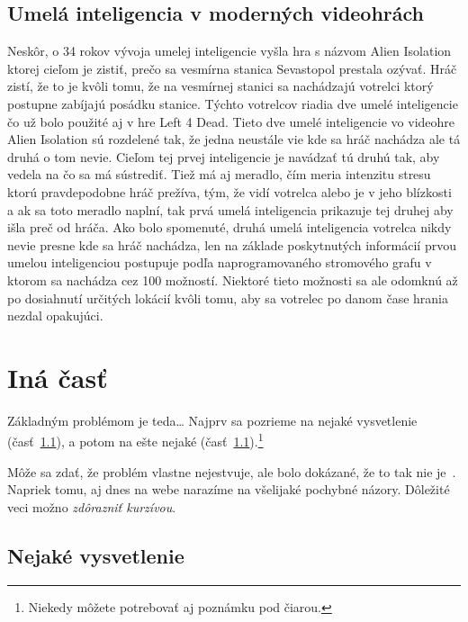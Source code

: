 \documentclass[10pt,twoside,slovak,a4paper]{article}
\begin{document}
\subsection{Umelá inteligencia v moderných videohrách} \label{kapitola2.3}
Neskôr, o 34 rokov vývoja umelej inteligencie vyšla hra s názvom Alien Isolation ktorej cieľom je zistiť, prečo sa vesmírna stanica Sevastopol prestala ozývať. Hráč zistí, že to je kvôli tomu, že na vesmírnej stanici sa nachádzajú votrelci ktorý postupne zabíjajú posádku stanice. Týchto votrelcov riadia dve umelé inteligencie čo už bolo použité aj v hre Left 4 Dead. Tieto dve umelé inteligencie vo videohre Alien Isolation sú rozdelené tak, že jedna neustále vie kde sa hráč nachádza ale tá druhá o tom nevie. Cieľom tej prvej inteligencie je navádzať tú druhú tak, aby vedela na čo sa má sústrediť. Tiež má aj meradlo, čím meria intenzitu stresu ktorú pravdepodobne hráč prežíva, tým, že vidí votrelca alebo je v jeho blízkosti a ak sa toto meradlo naplní, tak prvá umelá inteligencia prikazuje tej druhej aby išla preč od hráča. Ako bolo spomenuté, druhá umelá inteligencia votrelca nikdy nevie presne kde sa hráč nachádza, len na základe poskytnutých informácií prvou umelou inteligenciou postupuje podľa naprogramovaného stromového grafu v ktorom sa nachádza cez 100 možností. Niektoré tieto možnosti sa ale odomknú až po dosiahnutí určitých lokácií kvôli tomu, aby sa votrelec po danom čase hrania nezdal opakujúci.

\begin{figure*}[tbh]
\centering
\end{figure*}

\section{Iná časť} \label{ina}

Základným problémom je teda\ldots{} Najprv sa pozrieme na nejaké vysvetlenie (časť~\ref{ina:nejake}), a potom na ešte nejaké (časť~\ref{ina:nejake}).\footnote{Niekedy môžete potrebovať aj poznámku pod čiarou.}

Môže sa zdať, že problém vlastne nejestvuje\cite{Coplien:MPD}, ale bolo dokázané, že to tak nie je~\cite{Czarnecki:Staged, Czarnecki:Progress}. Napriek tomu, aj dnes na webe narazíme na všelijaké pochybné názory\cite{PLP-Framework}. Dôležité veci možno \emph{zdôrazniť kurzívou}.


\subsection{Nejaké vysvetlenie} \label{ina:nejake}
\end{document}
